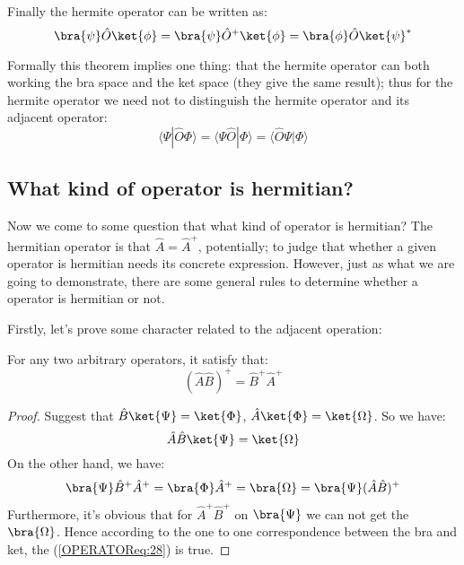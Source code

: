Finally the hermite operator can be written as:
\begin{equation}\label{OPERATOReq:6}
\bra{\psi}\hat{O}\ket{\phi} = \bra{\psi}\hat{O}^{+}\ket{\phi} =
\bra{\phi}\hat{O}\ket{\psi}^{*}
\end{equation}

Formally this theorem implies one thing: that the hermite operator
can both working the bra space and the ket space (they give the same
result); thus for the hermite operator we need not to distinguish
the hermite operator and its adjacent operator:
\begin{equation}\label{}
\langle\Psi|\hat{O}\Phi\rangle = \langle\Psi\hat{O}|\Phi\rangle =
\langle\hat{O}\Psi|\Phi\rangle
\end{equation}

\subsection{What kind of operator is hermitian?}
\label{hermitian_in_operator}
%
%
%
Now we come to some question that what kind of operator is
hermitian? The hermitian operator is that $\hat{A} = \hat{A}^{+}$,
potentially; to judge that whether a given operator is hermitian
needs its concrete expression. However, just as what we are going to
demonstrate, there are some general rules to determine whether a
operator is hermitian or not.

Firstly, let's prove some character related to the adjacent
operation:
\begin{theorem}
For any two arbitrary operators, it satisfy that:
\begin{equation}\label{OPERATOReq:28}
(\hat{A}\hat{B})^{+} = \hat{B}^{+}\hat{A}^{+}
\end{equation}
\end{theorem}

\begin{proof}
Suggest that $\hat{B}\ket{\Psi} = \ket{\Phi}$, $\hat{A}\ket{\Phi} =
\ket{\Omega}$. So we have:
\begin{equation}\label{}
\hat{A}\hat{B}\ket{\Psi} =\ket{\Omega}
\end{equation}
On the other hand, we have:
\begin{equation}\label{}
\bra{\Psi}\hat{B}^{+}\hat{A}^{+} = \bra{\Phi}\hat{A}^{+} =
\bra{\Omega} =\bra{\Psi}(\hat{A}\hat{B})^{+}
\end{equation}
Furthermore, it's obvious that for $\hat{A}^{+}\hat{B}^{+}$ on
$\bra{\Psi}$ we can not get the $\bra{\Omega}$. Hence according to
the one to one correspondence between the bra and ket, the
(\ref{OPERATOReq:28}) is true.
 \qedhere
\end{proof}

